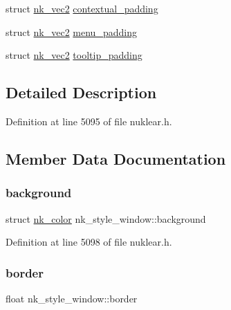 \begin{DoxyCompactItemize}
\item 
struct \mbox{\hyperlink{structnk__vec2}{nk\+\_\+vec2}} \mbox{\hyperlink{structnk__style__window_ad5a1c6956c11037f90209d910d01bdc4}{contextual\+\_\+padding}}
\item 
struct \mbox{\hyperlink{structnk__vec2}{nk\+\_\+vec2}} \mbox{\hyperlink{structnk__style__window_a10bea28d74c8475b42642fb6d7fd2a5e}{menu\+\_\+padding}}
\item 
struct \mbox{\hyperlink{structnk__vec2}{nk\+\_\+vec2}} \mbox{\hyperlink{structnk__style__window_a29a5792cc695d42f7d2509ebec405465}{tooltip\+\_\+padding}}
\end{DoxyCompactItemize}


\subsection{Detailed Description}


Definition at line 5095 of file nuklear.\+h.



\subsection{Member Data Documentation}
\mbox{\label{structnk__style__window_a0e55fd791308fc8d44db3a28736597fb}} 
\subsubsection{\texorpdfstring{background}{background}}
{\footnotesize\ttfamily struct \mbox{\hyperlink{structnk__color}{nk\+\_\+color}} nk\+\_\+style\+\_\+window\+::background}



Definition at line 5098 of file nuklear.\+h.

\mbox{\label{structnk__style__window_ad7fa0f645e10ec7bc6d62692e6d6edf9}} 
\subsubsection{\texorpdfstring{border}{border}}
{\footnotesize\ttfamily float nk\+\_\+style\+\_\+window\+::border}



